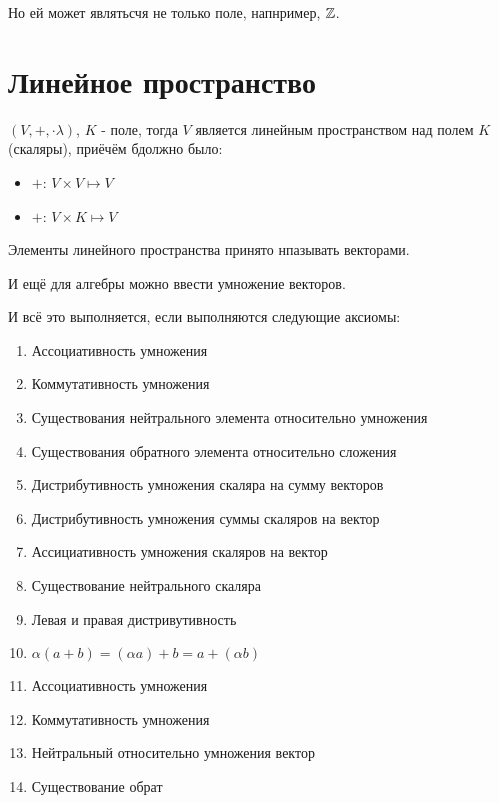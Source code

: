 \documentclass[12pt, a4paper]{article}
\begin{document}
    Но ей может являтьсчя не только поле, напнример, ${\mathbb{Z}}$.


    \section{Линейное пространство}

    \begin{definition}
        $(V, +, \cdot \lambda)$, $K$ - поле, тогда
        $V$ является линейным пространством над полем $K$ (скаляры), приёчём бдолжно было:
        \begin{itemize}
            \item $+$: $V \times V \mapsto V$
            \item $+$: $V \times K \mapsto V$
        \end{itemize}
        Элементы линейного пространства принято нпазывать векторами.
        
        И ещё для алгебры можно ввести умножение векторов.

        И всё это выполняется, если выполняются следующие аксиомы:
        \begin{enumerate}
            \item Ассоциативность умножения
            \item Коммутативность умножения
            \item Существования нейтрального элемента относительно умножения
            \item Существования обратного элемента относительно сложения
            \item Дистрибутивность умножения скаляра на сумму векторов
            \item Дистрибутивность умножения суммы скаляров на вектор
            \item Ассициативность умножения скаляров на вектор
            \item Существование нейтрального скаляра
            \item Левая и правая дистривутивность
            \item $\alpha (a + b) = (\alpha a) + b = a + (\alpha b)$
            \item Ассоциативность умножения
            \item Коммутативность умножения
            \item Нейтральный относительно умножения вектор
            \item Существование обрат
        \end{enumerate}
        
    \end{definition}
\end{document}
